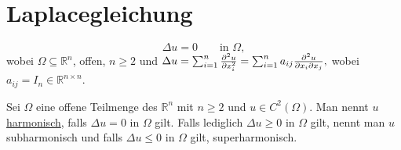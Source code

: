 \newpage
\section{Laplacegleichung} 
\label{sec:laplacegleichung}

\begin{equation}
	\Delta u = 0 \qquad \text{in }\Omega,
\end{equation}
wobei $\Omega \subseteq \mathbb{R}^n$, offen, $n \geq 2$ und $\Delta u = \sum^{n}_{i=1} \frac{{\partial ^2u}}{{\partial x_i^2}}  = \sum^{n}_{i=1} a_{ij} \frac{{\partial ^2u}}{{\partial x_i \partial x_j}} ,$ wobei $a_{ij}= I_n \in \mathbb{R}^{n \times n}$.

\begin{definition}
	Sei $\Omega$ eine offene Teilmenge des $\mathbb{R}^n$ mit $n \geq 2$ und $u \in C^2(\Omega)$. 
	Man nennt $u$ \underline{harmonisch}, falls $\Delta u = 0$ in $\Omega$ gilt. Falls lediglich $\Delta u \geq 0$ in $\Omega$ gilt, nennt man $u$ subharmonisch und falls $\Delta u \leq 0$ in $\Omega$ gilt, superharmonisch.
\end{definition}
	
